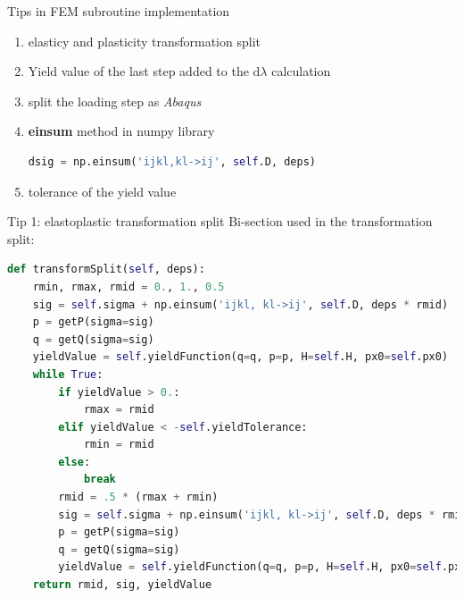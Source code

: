 \documentclass[aspectratio=169]{beamer}
\begin{document}
\begin{frame}[fragile]{Tips in FEM subroutine implementation}
    \begin{enumerate}
    	\item elasticy and plasticity transformation split
        \item Yield value of the last step added to the $\mathrm{d} \lambda$ calculation
        \item split the loading step as \textit{Abaqus}
        \item \textbf{einsum} method in numpy library 
        \begin{lstlisting}[language=Python]
dsig = np.einsum('ijkl,kl->ij', self.D, deps)
        \end{lstlisting}
    	\item tolerance of the yield value
    \end{enumerate}
\end{frame}

\begin{frame}[fragile]{Tip 1: elastoplastic transformation split}
	Bi-section used in the transformation split:
	\begin{lstlisting}[language=Python,basicstyle=\tiny]
def transformSplit(self, deps):
	rmin, rmax, rmid = 0., 1., 0.5
	sig = self.sigma + np.einsum('ijkl, kl->ij', self.D, deps * rmid)
	p = getP(sigma=sig)
	q = getQ(sigma=sig)
	yieldValue = self.yieldFunction(q=q, p=p, H=self.H, px0=self.px0)
	while True:
		if yieldValue > 0.:
			rmax = rmid
		elif yieldValue < -self.yieldTolerance:
			rmin = rmid
		else:
			break
		rmid = .5 * (rmax + rmin)
		sig = self.sigma + np.einsum('ijkl, kl->ij', self.D, deps * rmid)
		p = getP(sigma=sig)
		q = getQ(sigma=sig)
		yieldValue = self.yieldFunction(q=q, p=p, H=self.H, px0=self.px0)
	return rmid, sig, yieldValue
	\end{lstlisting}
\end{frame}
\end{document}
